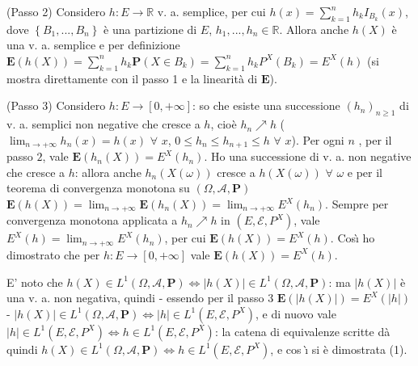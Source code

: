 \documentclass{article}
\begin{document}
(Passo 2) Considero $h:E\rightarrow 
\mathbb{R}
$ v. a. semplice, per cui $h\left( x\right)
=\sum_{k=1}^{n}h_{k}I_{B_{k}}\left( x\right) $, dove $\left\{
B_{1},...,B_{n}\right\} $ \`{e} una partizione di $E$, $h_{1},...,h_{n}\in 
\mathbb{R}
$. Allora anche $h\left( X\right) $ \`{e} una v. a. semplice e per
definizione $\mathbf{E}\left( h\left( X\right) \right) =\sum_{k=1}^{n}h_{k}%
\mathbf{P}\left( X\in B_{k}\right) =\sum_{k=1}^{n}h_{k}P^{X}\left(
B_{k}\right) =E^{X}\left( h\right) $ (si mostra direttamente con il passo 1
e la linearit\`{a} di $\mathbf{E}$).

(Passo 3) Considero $h:E\rightarrow \left[ 0,+\infty \right] $: so che
esiste una successione $\left( h_{n}\right) _{n\geq 1}$ di v. a. semplici
non negative che cresce a $h$, cio\`{e} $h_{n}\nearrow h$ ($%
\lim_{n\rightarrow +\infty }h_{n}\left( x\right) =h\left( x\right) $ $%
\forall $ $x$, $0\leq h_{n}\leq h_{n+1}\leq h$ $\forall $ $x$). Per ogni $n$%
, per il passo $2$, vale $\mathbf{E}\left( h_{n}\left( X\right) \right)
=E^{X}\left( h_{n}\right) $. Ho una successione di v. a. non negative che
cresce a $h$: allora anche $h_{n}\left( X\left( \omega \right) \right) $
cresce a $h\left( X\left( \omega \right) \right) $ $\forall $ $\omega $ e
per il teorema di convergenza monotona su $\left( \Omega ,\mathcal{A},%
\mathbf{P}\right) $ $\mathbf{E}\left( h\left( X\right) \right)
=\lim_{n\rightarrow +\infty }\mathbf{E}\left( h_{n}\left( X\right) \right)
=\lim_{n\rightarrow +\infty }E^{X}\left( h_{n}\right) $. Sempre per
convergenza monotona applicata a $h_{n}\nearrow h$ in $\left( E,\mathcal{E}%
,P^{X}\right) $, vale $E^{X}\left( h\right) =\lim_{n\rightarrow +\infty
}E^{X}\left( h_{n}\right) $, per cui $\mathbf{E}\left( h\left( X\right)
\right) =E^{X}\left( h\right) $. Cos\`{\i} ho dimostrato che per $%
h:E\rightarrow \left[ 0,+\infty \right] $ vale $\mathbf{E}\left( h\left(
X\right) \right) =E^{X}\left( h\right) $.

E' noto che $h\left( X\right) \in L^{1}\left( \Omega ,\mathcal{A},\mathbf{P}%
\right) \Longleftrightarrow \left\vert h\left( X\right) \right\vert \in
L^{1}\left( \Omega ,\mathcal{A},\mathbf{P}\right) $: ma $\left\vert h\left(
X\right) \right\vert $ \`{e} una v. a. non negativa, quindi - essendo per il
passo 3 $\mathbf{E}\left( \left\vert h\left( X\right) \right\vert \right)
=E^{X}\left( \left\vert h\right\vert \right) $ - $\left\vert h\left(
X\right) \right\vert \in L^{1}\left( \Omega ,\mathcal{A},\mathbf{P}\right)
\Longleftrightarrow \left\vert h\right\vert \in L^{1}\left( E,\mathcal{E}%
,P^{X}\right) $, e di nuovo vale $\left\vert h\right\vert \in L^{1}\left( E,%
\mathcal{E},P^{X}\right) \Longleftrightarrow h\in L^{1}\left( E,\mathcal{E}%
,P^{X}\right) $: la catena di equivalenze scritte d\`{a} quindi $h\left(
X\right) \in L^{1}\left( \Omega ,\mathcal{A},\mathbf{P}\right)
\Longleftrightarrow h\in L^{1}\left( E,\mathcal{E},P^{X}\right) $, e cos%
\`{\i} si \`{e} dimostrata (1).
\end{document}
